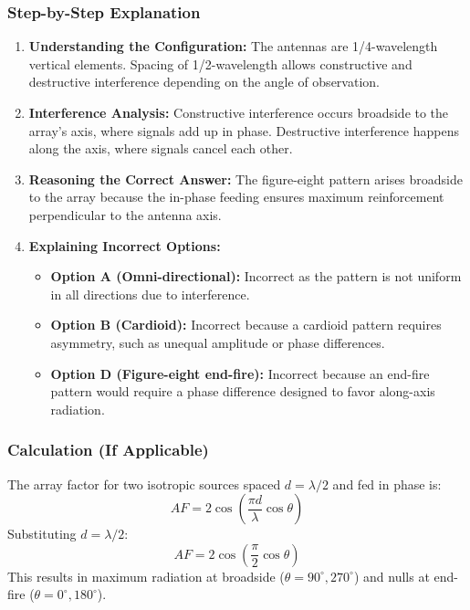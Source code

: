 \subsubsection{Step-by-Step Explanation}

\begin{enumerate}
    \item \textbf{Understanding the Configuration:} 
    The antennas are 1/4-wavelength vertical elements. Spacing of 1/2-wavelength allows constructive and destructive interference depending on the angle of observation.

    \item \textbf{Interference Analysis:}
    Constructive interference occurs broadside to the array's axis, where signals add up in phase. Destructive interference happens along the axis, where signals cancel each other.

    \item \textbf{Reasoning the Correct Answer:}
    The figure-eight pattern arises broadside to the array because the in-phase feeding ensures maximum reinforcement perpendicular to the antenna axis.

    \item \textbf{Explaining Incorrect Options:}
    \begin{itemize}
        \item \textbf{Option A (Omni-directional):} Incorrect as the pattern is not uniform in all directions due to interference.
        \item \textbf{Option B (Cardioid):} Incorrect because a cardioid pattern requires asymmetry, such as unequal amplitude or phase differences.
        \item \textbf{Option D (Figure-eight end-fire):} Incorrect because an end-fire pattern would require a phase difference designed to favor along-axis radiation.
    \end{itemize}
\end{enumerate}

\subsubsection{Calculation (If Applicable)}

The array factor for two isotropic sources spaced \( d = \lambda/2 \) and fed in phase is:
\[
AF = 2 \cos \left( \frac{\pi d}{\lambda} \cos \theta \right)
\]
Substituting \( d = \lambda/2 \):
\[
AF = 2 \cos \left( \frac{\pi}{2} \cos \theta \right)
\]
This results in maximum radiation at broadside (\( \theta = 90^\circ, 270^\circ \)) and nulls at end-fire (\( \theta = 0^\circ, 180^\circ \)).

